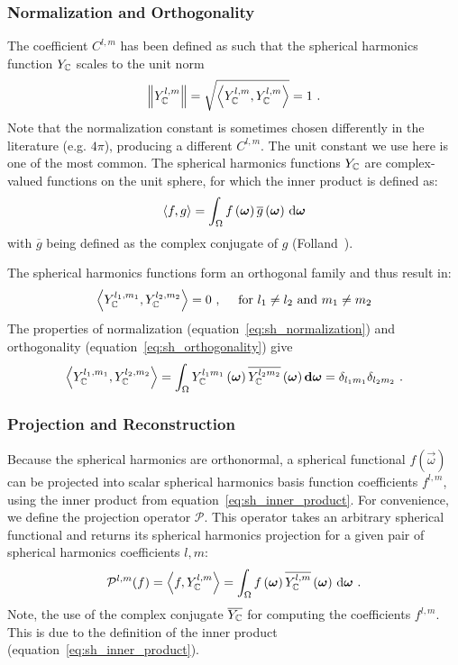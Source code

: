 \subsubsection*{Normalization and Orthogonality}

The coefficient $C^{l,m}$ has been defined as such that the spherical harmonics function $Y_{\mathbb{C}}$ scales to the unit norm
\begin{align}
\label{eq:sh_normalization}
\left\lVert Y_{\mathbb{C}}^{l,m}\right\rVert = \sqrt{\left<Y_{\mathbb{C}}^{l,m}, Y_{\mathbb{C}}^{l,m}\right>} = 1
\ .
\end{align}
Note that the normalization constant is sometimes chosen differently in the literature (e.g. $4\pi$), producing a different $C^{l,m}$. The unit constant we use here is one of the most common. The spherical harmonics functions $Y_{\mathbb{C}}$ are complex-valued functions on the unit sphere, for which the inner product is defined as:
\begin{align}
\label{eq:sh_inner_product}
\left<f,g\right> = \int_\Omega f\left(\boldsymbol{\mathbf{\omega}}\right)\overline{g}\left(\boldsymbol{\mathbf{\omega}}\right)\,\mathrm{d}\boldsymbol{\mathbf{\omega}}
\end{align}
with $\overline{g}$ being defined as the complex conjugate of $g$ (Folland~\cite{Folland92}).

The spherical harmonics functions form an orthogonal family and thus result in:
\begin{align}
\left<Y_{\mathbb{C}}^{l_1, m_1},Y_{\mathbb{C}}^{l_2, m_2}\right>
=
0
\ ,\quad\text{ for } l_1 \ne l_2 \text{ and } m_1 \ne m_2
\end{align}
The properties of normalization (equation~\ref{eq:sh_normalization}) and orthogonality (equation~\ref{eq:sh_orthogonality}) give
\begin{align}
\label{eq:sh_orthogonality}
\left<Y_{\mathbb{C}}^{l_1, m_1},Y_{\mathbb{C}}^{l_2, m_2}\right>=
\int_{\Omega} Y_{\mathbb{C}}^{l_1m_1}\left(\boldsymbol{\mathbf{\omega}}\right) \overline{Y_{\mathbb{C}}^{l_2m_2}}\left(\boldsymbol{\mathbf{\omega}}\right) \mathbf{d}\boldsymbol{\mathbf{\omega}} = \delta_{l_1m_1}\delta_{l_2m_2}
\ .
\end{align}

\subsubsection*{Projection and Reconstruction}

Because the spherical harmonics are orthonormal, a spherical functional $f\left(\vec{\omega}\right)$ can be projected into scalar spherical harmonics basis function coefficients $f^{l,m}$, using the inner product from equation~\ref{eq:sh_inner_product}. For convenience, we define the projection operator $\mathcal{P}$. This operator takes an arbitrary spherical functional and returns its spherical harmonics projection for a given pair of spherical harmonics coefficients $l,m$:
\begin{align}
\label{eq:sh_projection}
\mathcal{P}^{l, m}(f) =  \left<f,Y_{\mathbb{C}}^{l, m}\right> = 
\int_\Omega f\left(\boldsymbol{\mathbf{\omega}}\right)\overline{Y_{\mathbb{C}}^{l,m}}\left(\boldsymbol{\mathbf{\omega}}\right)\,\mathrm{d}\boldsymbol{\mathbf{\omega}}
\ .
\end{align}
Note, the use of the complex conjugate $\overline{Y_{\mathbb{C}}}$ for computing the coefficients $f^{l,m}$. This is due to the definition of the inner product (equation~\ref{eq:sh_inner_product}). 

